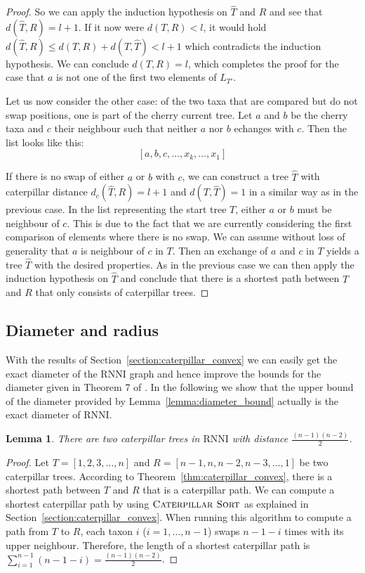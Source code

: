\documentclass{amsart}
\newcommand{\rnni}{\mathrm{RNNI}}
\newcommand{\csort}{\textsc{Caterpillar Sort}}
\newtheorem{lemma}[definition]{Lemma}
\begin{document}
\begin{proof}
So we can apply the induction hypothesis on $\hat T$ and $R$ and see that $d(\hat T,R) = l+1$.
If it now were $d(T,R) < l$, it would hold $d(\hat T,R) \leq d(T,R) + d(T,\hat T) < l + 1$ which contradicts the induction hypothesis.
We can conclude $d(T,R) = l$, which completes the proof for the case that $a$ is not one of the first two elements of $L_{T'}$.

Let us now consider the other case:
of the two taxa that are compared but do not swap positions, one is part of the cherry current tree.
Let $a$ and $b$ be the cherry taxa and $c$ their neighbour such that neither $a$ nor $b$ echanges with $c$.
Then the list looks like this:
\[[a, b, c, \ldots, x_k, \ldots, x_1]\]

If there is no swap of either $a$ or $b$ with $c$, we can construct a tree $\hat T$ with caterpillar distance $d_c(\hat T, R) = l+1$ and $d(T,\hat T) = 1$ in a similar way as in the previous case.
In the list representing the start tree $T$, either $a$ or $b$ must be neighbour of $c$.
This is due to the fact that we are currently considering the first comparison of elements where there is no swap.
We can assume without loss of generality that $a$ is neighbour of $c$ in $T$.
Then an exchange of $a$ and $c$ in $T$ yields a tree $\hat T$ with the desired properties.
As in the previous case we can then apply the induction hypothesis on $\hat T$ and conclude that there is a shortest path between $T$ and $R$ that only consists of caterpillar trees.
\end{proof}


\subsection{Diameter and radius}
\label{section:diameter}

With the results of Section~\ref{section:caterpillar_convex} we can easily get the exact diameter of the $\rnni$ graph and hence improve the bounds for the diameter given in Theorem 7 of \autocite{Gavryushkin2018-ol}.
In the following we show that the upper bound of the diameter provided by Lemma~\ref{lemma:diameter_bound} actually is the exact diameter of $\rnni$.

\begin{lemma}
There are two caterpillar trees in $\rnni$ with distance $\frac{(n-1)(n-2)}{2}$.
\label{lemma:caterpillar_diameter}
\end{lemma}

\begin{proof}
Let $T = [1,2,3,\ldots,n]$ and $R = [n-1,n,n-2,n-3, \ldots, 1]$ be two caterpillar trees.
According to Theorem~\ref{thm:caterpillar_convex}, there is a shortest path between $T$ and $R$ that is a caterpillar path.
We can compute a shortest caterpillar path by using $\csort$ as explained in Section~\ref{section:caterpillar_convex}.
When running this algorithm to compute a path from $T$ to $R$, each taxon $i$ ($i = 1, \ldots, n-1$) swaps $n-1-i$ times with its upper neighbour.
Therefore, the length of a shortest caterpillar path is $\sum\limits_{i=1}^{n-1}(n-1-i)  = \frac{(n-1)(n-2)}{2}$.
\end{proof}
\end{document}
